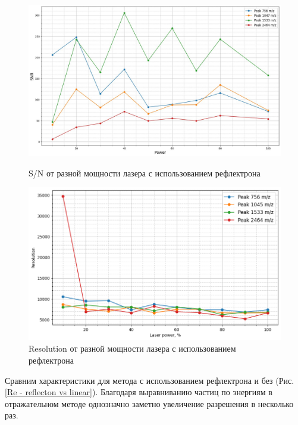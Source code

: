 \documentclass{article}
\begin{document}
\begin{figure}[h!] 
        \centering
        \centering
            \includegraphics[width=0.9\linewidth]{Images/SN(reflectron).jpg}
                 \caption{S/N от разной мощности лазера с использованием рефлектрона}
                 \label{SN - reflecton}
        \endminipage\hfill
        \centering
             \includegraphics[width=0.9\linewidth]{Images/Res(reflecton).png}
                 \caption{Resolution от разной мощности лазера с использованием рефлектрона}
                 \label{Re - reflecton}
        \endminipage
\end{figure}
\par Сравним характеристики для метода с использованием рефлектрона и без (Рис. \ref{Re - reflecton vs linear}). Благодаря выравниванию частиц по энергиям в отражательном методе однозначно заметно увеличение разрешения в несколько раз.
\end{document}
